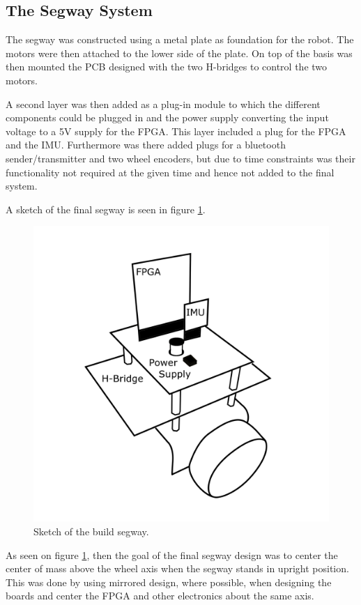 
\subsection{The Segway System}
The segway was constructed using a metal plate as foundation for the robot.
The motors were then attached to the lower side of the plate.
On top of the basis was then mounted the PCB designed with the two H-bridges to control the two motors.

A second layer was then added as a plug-in module to which the different components could be plugged in and the power supply converting the input voltage to a 5V supply for the FPGA.
This layer included a plug for the FPGA and the IMU.
Furthermore was there added plugs for a bluetooth sender/transmitter and two wheel encoders, but due to time constraints was their functionality not required at the given time and hence not added to the final system.

A sketch of the final segway is seen in figure \ref{fig:segwaysketch}.

\begin{figure}[H]
\centering
\includegraphics[width = 0.5 \textwidth]{images/segway}
\caption{Sketch of the build segway.}
\label{fig:segwaysketch}
\end{figure}

As seen on figure \ref{fig:segwaysketch}, then the goal of the final segway design was to center the center of mass above the wheel axis when the segway stands in upright position.
This was done by using mirrored design, where possible, when designing the boards and center the FPGA and other electronics about the same axis.
